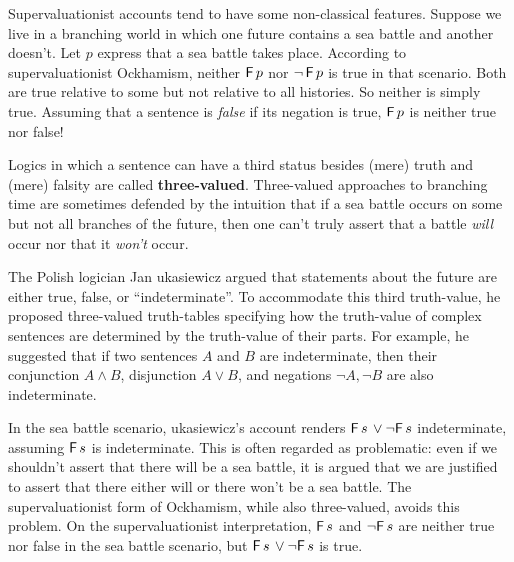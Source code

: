 Supervaluationist accounts tend to have some non-classical features. Suppose we
live in a branching world in which one future contains a sea battle and another
doesn't. Let $p$ express that a sea battle takes place. According to
supervaluationist Ockhamism, neither $\operatorname{\mathsf{F}} p$ nor $\neg \operatorname{\mathsf{F}} p$ is true in that
scenario. Both are true relative to some but not relative to all histories.
So neither is simply true. Assuming that a sentence is \emph{false}
if its negation is true, $\operatorname{\mathsf{F}} p$ is neither true nor false!

Logics in which a sentence can have a third status besides (mere) truth and
(mere) falsity are called \textbf{three-valued}. Three-valued approaches to
branching time are sometimes defended by the intuition that if a sea battle
occurs on some but not all branches of the future, then one can't truly assert
that a battle \emph{will} occur nor that it \emph{won't} occur.

The Polish logician Jan \polishL{}ukasiewicz argued that statements about the
future are either true, false, or ``indeterminate''. To accommodate this third
truth-value, he proposed three-valued truth-tables specifying how the
truth-value of complex sentences are determined by the truth-value of their
parts. For example, he suggested that if two sentences $A$ and $B$ are
indeterminate, then their conjunction $A \land B$, disjunction $A \lor B$, and
negations $\neg A, \neg B$ are also indeterminate.

In the sea battle scenario, \polishL{}ukasiewicz's account renders
$\operatorname{\mathsf{F}} s \,\lor \neg\! \operatorname{\mathsf{F}} s$ indeterminate, assuming $\operatorname{\mathsf{F}} s$ is indeterminate. This
is often regarded as problematic: even if we shouldn't assert that there will be
a sea battle, it is argued that we are justified to assert that there either
will or there won't be a sea battle. The supervaluationist form of Ockhamism,
while also three-valued, avoids this problem. On the supervaluationist
interpretation, $\operatorname{\mathsf{F}} s$ and $\neg \!\operatorname{\mathsf{F}} s$ are neither true nor false in the sea
battle scenario, but $\operatorname{\mathsf{F}} s \,\lor \neg \!\operatorname{\mathsf{F}} s$ is true.

